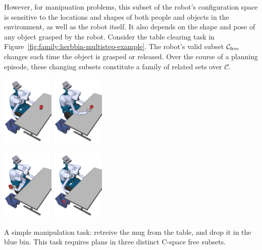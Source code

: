 However,
for manipuation problems,
this subset of the robot's configuration space
is sensitive to the locations and shapes of
both people and objects in the environment,
as well as the robot itself.
It also depends on the shape and pose of any object
grasped by the robot.
Consider the table clearing task in
Figure~\ref{fig:family:herbbin-multistep-example}.
The robot's valid subset $\mathcal{C}_{\mbox{\scriptsize free}}$
changes each time the object is grasped or released.
Over the course of a planning episode,
these changing subsets constitute a family of related sets over
$\mathcal{C}$.

\begin{marginfigure}
   \centering
   \includegraphics[width=2.5cm]{figs/herbbin/step0cropped.png}%
   \includegraphics[width=2.5cm]{figs/herbbin/step01cropped.png}

   \includegraphics[width=2.5cm]{figs/herbbin/step12cropped.png}%
   \includegraphics[width=2.5cm]{figs/herbbin/step2cropped.png}

   \caption{A simple manipulation task: retreive the mug from
      the table, and drop it in the blue bin.
      This task requires plans in three distinct C-space free subsets.}
   \label{fig:family:herbbin-multistep-example}
\end{marginfigure}

